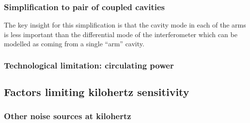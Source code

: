\subsubsection{Simplification to pair of coupled cavities}

The key insight for this simplification is that the cavity mode in each of the arms is less important than the differential mode of the interferometer  which can be modelled as coming from a single ``arm'' cavity.


\subsubsection{Technological limitation: circulating power}



\subsection{Factors limiting kilohertz sensitivity}




\subsubsection{Other noise sources at kilohertz} %

